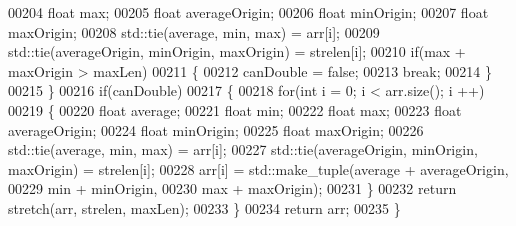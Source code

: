 \begin{DoxyCode}
00204         \textcolor{keywordtype}{float} max;
00205         \textcolor{keywordtype}{float} averageOrigin;
00206         \textcolor{keywordtype}{float} minOrigin;
00207         \textcolor{keywordtype}{float} maxOrigin;
00208         std::tie(average, min, max) = arr[i];
00209         std::tie(averageOrigin, minOrigin, maxOrigin) = strelen[i];
00210         \textcolor{keywordflow}{if}(max + maxOrigin > maxLen)
00211         \{
00212             canDouble = \textcolor{keyword}{false};
00213             \textcolor{keywordflow}{break};
00214         \}
00215     \}
00216     \textcolor{keywordflow}{if}(canDouble)
00217     \{
00218         \textcolor{keywordflow}{for}(\textcolor{keywordtype}{int} i = 0; i < arr.size(); i ++)
00219         \{
00220             \textcolor{keywordtype}{float} average;
00221             \textcolor{keywordtype}{float} min;
00222             \textcolor{keywordtype}{float} max;
00223             \textcolor{keywordtype}{float} averageOrigin;
00224             \textcolor{keywordtype}{float} minOrigin;
00225             \textcolor{keywordtype}{float} maxOrigin;
00226             std::tie(average, min, max) = arr[i];
00227             std::tie(averageOrigin, minOrigin, maxOrigin) = strelen[i];
00228             arr[i] = std::make\_tuple(average + averageOrigin,
00229                                      min + minOrigin,
00230                                      max + maxOrigin);
00231         \}
00232         \textcolor{keywordflow}{return} stretch(arr, strelen, maxLen);
00233     \}
00234     \textcolor{keywordflow}{return} arr;
00235 \}
\end{DoxyCode}

